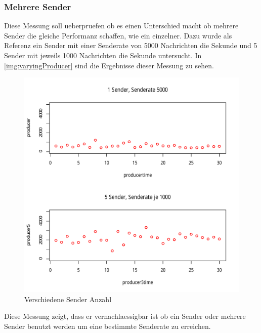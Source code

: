 \subsubsection{Mehrere Sender}
Diese Messung soll ueberpruefen ob es einen Unterschied macht ob mehrere Sender die gleiche Performanz schaffen, wie ein einzelner. Dazu wurde als Referenz ein Sender mit einer Senderate von 5000 Nachrichten die Sekunde und 5 Sender mit jeweils 1000 Nachrichten die Sekunde untersucht. 
In \autoref{img:varyingProducer} sind die Ergebnisse dieser Messung zu sehen. 
\begin{figure}
\center
  \includegraphics[width=1\textwidth]{images/measurement/varying-producer.pdf}
  \caption{Verschiedene Sender Anzahl}
  \label{img:varyingProducer}
\end{figure}
Diese Messung zeigt, dass er vernachlaessigbar ist ob ein Sender oder mehrere Sender benutzt werden um eine bestimmte Senderate zu erreichen. 
